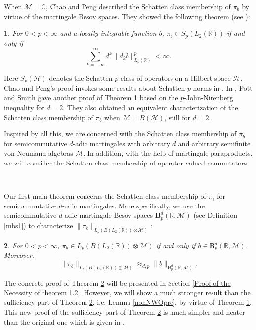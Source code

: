 \documentclass[oneside,english,a4wide]{amsart}
\numberwithin{equation}{section}
\numberwithin{figure}{section}
\theoremstyle{plain}
\newtheorem{thm}{\protect\theoremname}[section]
\theoremstyle{plain}
\theoremstyle{definition}
\theoremstyle{plain}
\theoremstyle{remark}
\theoremstyle{definition}
\theoremstyle{remark}
\theoremstyle{definition}
\providecommand{\theoremname}{Theorem}
\newcommand{\M}{{\mathcal M}}
\newcommand{\8}{\infty}
\begin{document}
When $\M=\mathbb{C}$, Chao and Peng described the Schatten class membership of $\pi_b$ by virtue of the martingale Besov spaces. They showed the following theorem (see {\cite[Theorem 3.1]{CP}}):
\begin{thm}\label{lem2.1}
	For $0<p<\infty$ and a locally integrable function $b$, $\pi_b\in S_p(L_2(\mathbb{R}))$ if and only if
	$$ \sum_{k=-\infty}^\infty d^{k}\|d_kb\|_{L_p(\mathbb{R})}^p<\8.  $$
\end{thm}
	Here $S_p(\mathcal{H})$ denotes the Schatten $p$-class of operators on a Hilbert space $\mathcal{H}$. Chao and Peng's proof invokes some results about Schatten $p$-norms in \cite{RSe}. In \cite{PS}, Pott and Smith gave another proof of Theorem \ref{lem2.1} based on the $p$-John-Nirenberg inequality for $d=2$. They also obtained an equivalent characterization of the Schatten class membership of $\pi_b$ when $\M=B(\mathcal{H})$, still for $d=2$.
	
	Inspired by all this, we are concerned with the Schatten class membership of $\pi_b$ for semicommutative $d$-adic martingales with arbitrary $d$ and arbitrary semifinite von Neumann algebras $\M$. In addition, with the help of martingale paraproducts, we will consider the Schatten class membership of operator-valued commutators.
	
	\

Our first main theorem concerns the Schatten class membership of $\pi_b$ for semicommutative $d$-adic martingales. More specifically, we use the semicommutative $d$-adic martingale Besov spaces $\pmb{B}_p^d(\mathbb{R},\M)$ (see Definition \ref{mbs1}) to characterize $\|\pi_b\|_{L_p(B(L_2(\mathbb{R}))\otimes \mathcal{M})}$:
 \begin{thm}\label{thm1.2}
	For $0<p<\infty$, $\pi_b\in L_p(B(L_2(\mathbb{R}))\otimes \mathcal{M})$ if and only if $b\in \pmb{B}_p^d(\mathbb{R},\M)$. Moreover,
	\begin{equation}\label{thm2222}
		\|\pi_b\|_{L_p(B(L_2(\mathbb{R}))\otimes \mathcal{M})}\approx_{d, p} \|b\|_{ \pmb{B}_p^d(\mathbb{R},\M)}.
	\end{equation}
\end{thm}

The concrete proof of Theorem \ref{thm1.2} will be presented in Section \ref{Proof of the Necessity of theorem 1.2}. However, we will show a much stronger result than the sufficiency part of Theorem \ref{thm1.2}, i.e. Lemma \ref{nonNWOpre}, by virtue of Theorem \ref{lem2.1}. This new proof of the sufficiency part of Theorem \ref{thm1.2} is much simpler and neater than the original one which is given in \cite{Hao}.
 
\end{document}
